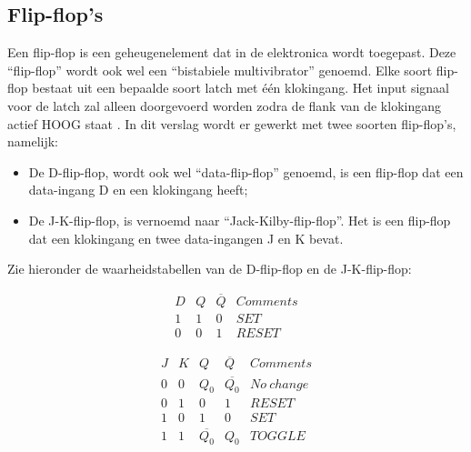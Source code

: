 \documentclass[12pt]{article}
\begin{document}
\subsection{Flip-flop's}
Een flip-flop is een geheugenelement dat in de elektronica wordt toegepast. Deze ``flip-flop'' wordt ook wel een ``bistabiele multivibrator'' genoemd. 
Elke soort flip-flop bestaat uit een bepaalde soort latch met één klokingang. Het input signaal voor de latch zal alleen doorgevoerd worden zodra de flank van de klokingang actief HOOG staat \cite{Flowers1983}. 
In dit verslag wordt er gewerkt met twee soorten flip-flop's, namelijk:
\begin{itemize}
    \item De D-flip-flop, wordt ook wel ``data-flip-flop'' genoemd, is een flip-flop dat een data-ingang D en een klokingang heeft;
    \item De J-K-flip-flop, is vernoemd naar ``Jack-Kilby-flip-flop''. Het is een flip-flop dat een klokingang en twee data-ingangen J en K bevat.
\end{itemize}
Zie hieronder de waarheidstabellen van de D-flip-flop en de J-K-flip-flop:
\begin{figure}[h]
    \begin{minipage}{.5\textwidth}
\begin{displaymath}
    \begin{array}{|c||c|c|c|}
    D & Q & \overline{Q} & Comments\\
    \hline 
    1 & 1 & 0 & SET \\
    0 & 0 & 1 & RESET
  \end{array}
    \end{displaymath}
\end{minipage}
\begin{minipage}{.5\textwidth}
\begin{displaymath}
    \begin{array}{|c|c||c|c|c|}
    J & K & Q & \overline{Q} & Comments\\
    \hline 
    0 & 0 & Q_{0} & \overline{Q_{0}} & No\ change\\
    0 & 1 & 0 & 1 & RESET\\
    1 & 0 & 1 & 0 & SET\\
    1 & 1 & \overline{Q_{0}} & Q_{0} & TOGGLE 
  \end{array}
    \end{displaymath}
\end{minipage}
\end{figure}
\\ 
\end{document}
